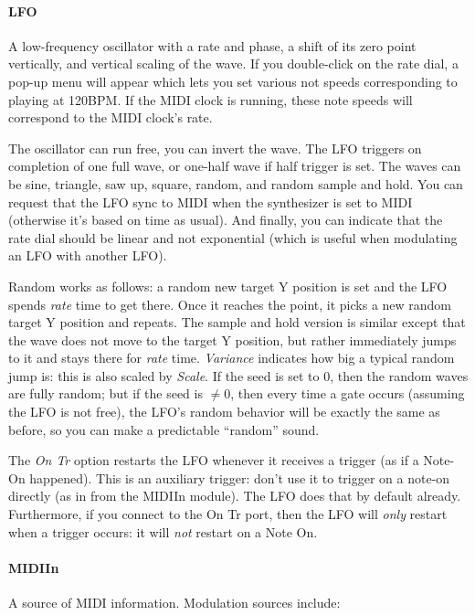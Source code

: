 \documentclass{article}
\begin{document}
\paragraph{LFO}  A low-frequency oscillator with a rate and phase, a shift of its zero point vertically, and vertical scaling of the wave.   If you double-click on the rate dial, a pop-up menu will appear which lets you set various not speeds corresponding to playing at 120BPM.  If the MIDI clock is running, these note speeds will correspond to the MIDI clock's rate.

The oscillator can run free, you can invert the wave.    The LFO triggers on completion of one full wave, or one-half wave if half trigger is set.  The waves can be sine, triangle, saw up, square, random, and random sample and hold.   You can request that the LFO sync to MIDI when the synthesizer is set to MIDI (otherwise it's based on time as usual).  And finally, you can indicate that the rate dial should be linear and not exponential (which is useful when modulating an LFO with another LFO).

Random works as follows: a random new target Y position is set and the LFO spends {\it rate} time to get there.  Once it reaches the point, it picks a new random target Y position and repeats.  The sample and hold version is similar except that the wave does not move to the target Y position, but rather immediately jumps to it and stays there for {\it rate} time.   {\it Variance} indicates how big a typical random jump is: this is also scaled by {\it Scale}.  If the seed is set to 0, then the random waves are fully random; but if the seed is \(\neq 0\), then every time a gate occurs (assuming the LFO is not free), the LFO's random behavior will be exactly the same as before, so you can make a predictable ``random'' sound.

The {\it On Tr} option restarts the LFO whenever it receives a trigger (as if a Note-On happened).  This is an auxiliary trigger: don't use it to trigger on a note-on directly (as in from the MIDIIn module).  The LFO does that by default already.  Furthermore, if you connect to the On Tr port, then the LFO will {\it only} restart when a trigger occurs: it will {\it not} restart on a Note On.

\paragraph{MIDIIn}  A source of MIDI information.  Modulation sources include:
\end{document}

